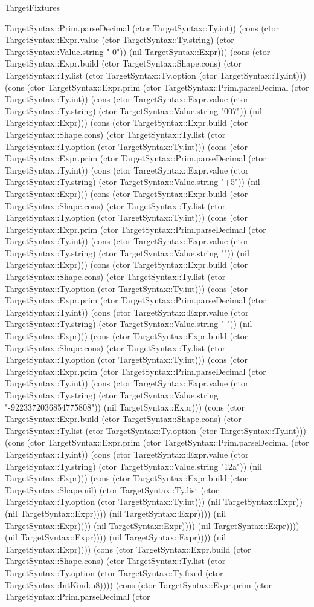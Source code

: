 \begin{lexlean}{TargetFixtures}
\begin{semanticmodule}
{TargetSyntax::Prim.parseDecimal (ctor TargetSyntax::Ty.int)) (cons (ctor TargetSyntax::Expr.value (ctor TargetSyntax::Ty.string) (ctor TargetSyntax::Value.string "-0")) (nil TargetSyntax::Expr))) (cons (ctor TargetSyntax::Expr.build (ctor TargetSyntax::Shape.cons) (ctor TargetSyntax::Ty.list (ctor TargetSyntax::Ty.option (ctor TargetSyntax::Ty.int))) (cons (ctor TargetSyntax::Expr.prim (ctor TargetSyntax::Prim.parseDecimal (ctor TargetSyntax::Ty.int)) (cons (ctor TargetSyntax::Expr.value (ctor TargetSyntax::Ty.string) (ctor TargetSyntax::Value.string "007")) (nil TargetSyntax::Expr))) (cons (ctor TargetSyntax::Expr.build (ctor TargetSyntax::Shape.cons) (ctor TargetSyntax::Ty.list (ctor TargetSyntax::Ty.option (ctor TargetSyntax::Ty.int))) (cons (ctor TargetSyntax::Expr.prim (ctor TargetSyntax::Prim.parseDecimal (ctor TargetSyntax::Ty.int)) (cons (ctor TargetSyntax::Expr.value (ctor TargetSyntax::Ty.string) (ctor TargetSyntax::Value.string "+5")) (nil TargetSyntax::Expr))) (cons (ctor TargetSyntax::Expr.build (ctor TargetSyntax::Shape.cons) (ctor TargetSyntax::Ty.list (ctor TargetSyntax::Ty.option (ctor TargetSyntax::Ty.int))) (cons (ctor TargetSyntax::Expr.prim (ctor TargetSyntax::Prim.parseDecimal (ctor TargetSyntax::Ty.int)) (cons (ctor TargetSyntax::Expr.value (ctor TargetSyntax::Ty.string) (ctor TargetSyntax::Value.string "")) (nil TargetSyntax::Expr))) (cons (ctor TargetSyntax::Expr.build (ctor TargetSyntax::Shape.cons) (ctor TargetSyntax::Ty.list (ctor TargetSyntax::Ty.option (ctor TargetSyntax::Ty.int))) (cons (ctor TargetSyntax::Expr.prim (ctor TargetSyntax::Prim.parseDecimal (ctor TargetSyntax::Ty.int)) (cons (ctor TargetSyntax::Expr.value (ctor TargetSyntax::Ty.string) (ctor TargetSyntax::Value.string "-")) (nil TargetSyntax::Expr))) (cons (ctor TargetSyntax::Expr.build (ctor TargetSyntax::Shape.cons) (ctor TargetSyntax::Ty.list (ctor TargetSyntax::Ty.option (ctor TargetSyntax::Ty.int))) (cons (ctor TargetSyntax::Expr.prim (ctor TargetSyntax::Prim.parseDecimal (ctor TargetSyntax::Ty.int)) (cons (ctor TargetSyntax::Expr.value (ctor TargetSyntax::Ty.string) (ctor TargetSyntax::Value.string "-9223372036854775808")) (nil TargetSyntax::Expr))) (cons (ctor TargetSyntax::Expr.build (ctor TargetSyntax::Shape.cons) (ctor TargetSyntax::Ty.list (ctor TargetSyntax::Ty.option (ctor TargetSyntax::Ty.int))) (cons (ctor TargetSyntax::Expr.prim (ctor TargetSyntax::Prim.parseDecimal (ctor TargetSyntax::Ty.int)) (cons (ctor TargetSyntax::Expr.value (ctor TargetSyntax::Ty.string) (ctor TargetSyntax::Value.string "12a")) (nil TargetSyntax::Expr))) (cons (ctor TargetSyntax::Expr.build (ctor TargetSyntax::Shape.nil) (ctor TargetSyntax::Ty.list (ctor TargetSyntax::Ty.option (ctor TargetSyntax::Ty.int))) (nil TargetSyntax::Expr)) (nil TargetSyntax::Expr)))) (nil TargetSyntax::Expr)))) (nil TargetSyntax::Expr)))) (nil TargetSyntax::Expr)))) (nil TargetSyntax::Expr)))) (nil TargetSyntax::Expr)))) (nil TargetSyntax::Expr)))) (nil TargetSyntax::Expr)))) (cons (ctor TargetSyntax::Expr.build (ctor TargetSyntax::Shape.cons) (ctor TargetSyntax::Ty.list (ctor TargetSyntax::Ty.option (ctor TargetSyntax::Ty.fixed (ctor TargetSyntax::IntKind.u8)))) (cons (ctor TargetSyntax::Expr.prim (ctor TargetSyntax::Prim.parseDecimal (ctor }
\end{semanticmodule}
\end{lexlean}
